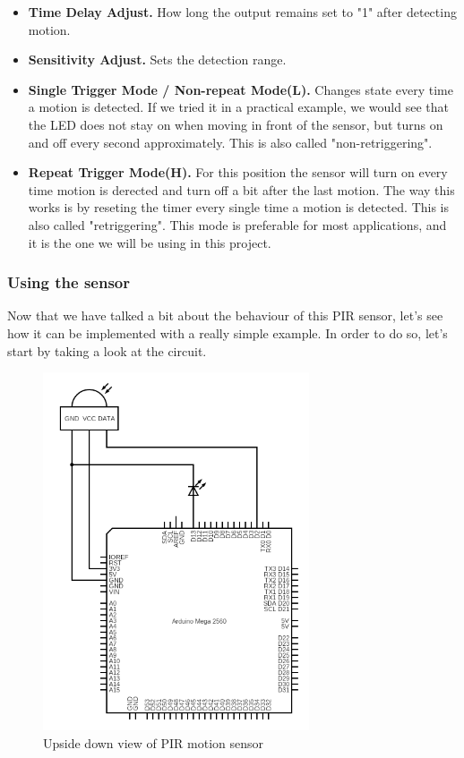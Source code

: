 \begin{itemize}
	\item \textbf{Time Delay Adjust.} How long the output remains set to "1" after detecting motion.
	\item \textbf{Sensitivity Adjust.} Sets the detection range.
	\item \textbf{Single Trigger Mode / Non-repeat Mode(L).} Changes state every time a motion is detected. If we tried it in a practical example, we would see that the LED does not stay on when moving in front of the sensor, but turns on and off every second approximately. This is also called "non-retriggering". 
	\item \textbf{Repeat Trigger Mode(H).} For this position the sensor will turn on every time motion is derected and turn off a bit after the last motion. The way this works is by reseting the timer every single time a motion is detected. This is also called "retriggering". This mode is preferable for most applications, and it is the one we will be using in this project.
\end{itemize}

\subsubsection{Using the sensor}
Now that we have talked a bit about the behaviour of this PIR sensor, let's see how it can be implemented with a really simple example. In order to do so, let's start by taking a look at the circuit.

\begin{figure}[H]
    \centering
    \includegraphics[width=0.7\textwidth]{fig/pir-scheme-circuit.png}
    \caption{Upside down view of PIR motion sensor}
    \label{fig:pir-scheme-circuit}
\end{figure}

